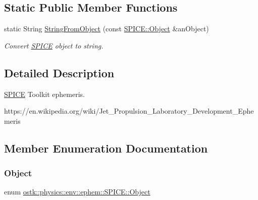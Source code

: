 \subsection*{Static Public Member Functions}
\begin{DoxyCompactItemize}
\item 
static String \hyperlink{classostk_1_1physics_1_1env_1_1ephem_1_1_s_p_i_c_e_a97570f88c117786553614fc42d1ac5ff}{String\+From\+Object} (const \hyperlink{classostk_1_1physics_1_1env_1_1ephem_1_1_s_p_i_c_e_ae84db78d858cdd0a1dc3ff53090f4a1f}{S\+P\+I\+C\+E\+::\+Object} \&an\+Object)
\begin{DoxyCompactList}\small\item\em Convert \hyperlink{classostk_1_1physics_1_1env_1_1ephem_1_1_s_p_i_c_e}{S\+P\+I\+CE} object to string. \end{DoxyCompactList}\end{DoxyCompactItemize}


\subsection{Detailed Description}
\hyperlink{classostk_1_1physics_1_1env_1_1ephem_1_1_s_p_i_c_e}{S\+P\+I\+CE} Toolkit ephemeris. 

https\+://en.wikipedia.\+org/wiki/\+Jet\+\_\+\+Propulsion\+\_\+\+Laboratory\+\_\+\+Development\+\_\+\+Ephemeris 

\subsection{Member Enumeration Documentation}
\mbox{\label{classostk_1_1physics_1_1env_1_1ephem_1_1_s_p_i_c_e_ae84db78d858cdd0a1dc3ff53090f4a1f}} 
\subsubsection{\texorpdfstring{Object}{Object}}
{\footnotesize\ttfamily enum \hyperlink{classostk_1_1physics_1_1env_1_1ephem_1_1_s_p_i_c_e_ae84db78d858cdd0a1dc3ff53090f4a1f}{ostk\+::physics\+::env\+::ephem\+::\+S\+P\+I\+C\+E\+::\+Object}\hspace{0.3cm}{\ttfamily [strong]}}




